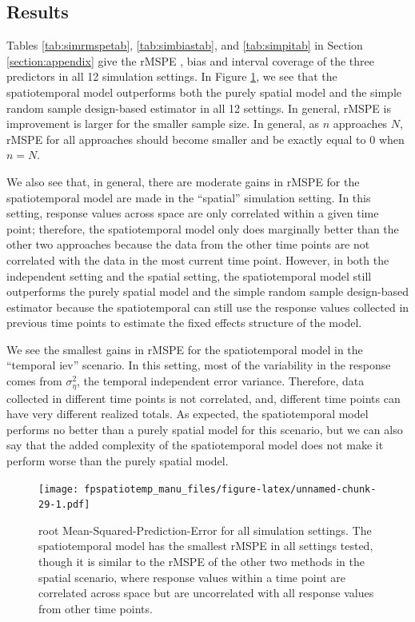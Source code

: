 \documentclass[]{interact}
\theoremstyle{plain}%
\theoremstyle{definition}
\theoremstyle{remark}
\begin{document}
\subsection{Results}

Tables \ref{tab:simrmspetab}, \ref{tab:simbiastab}, and
\ref{tab:simpitab} in Section \ref{section:appendix} give the rMSPE ,
bias and interval coverage of the three predictors in all 12 simulation
settings. In Figure \ref{fig:rmspe}, we see that the spatiotemporal
model outperforms both the purely spatial model and the simple random
sample design-based estimator in all 12 settings. In general, rMSPE is
improvement is larger for the smaller sample size. In general, as \(n\)
approaches \(N\), rMSPE for all approaches should become smaller and be
exactly equal to 0 when \(n = N\).

We also see that, in general, there are moderate gains in rMSPE for the
spatiotemporal model are made in the ``spatial'' simulation setting. In
this setting, response values across space are only correlated within a
given time point; therefore, the spatiotemporal model only does
marginally better than the other two approaches because the data from
the other time points are not correlated with the data in the most
current time point. However, in both the independent setting and the
spatial setting, the spatiotemporal model still outperforms the purely
spatial model and the simple random sample design-based estimator
because the spatiotemporal can still use the response values collected
in previous time points to estimate the fixed effects structure of the
model.

We see the smallest gains in rMSPE for the spatiotemporal model in the
``temporal iev'' scenario. In this setting, most of the variability in
the response comes from \(\sigma^2_{\eta}\), the temporal independent
error variance. Therefore, data collected in different time points is
not correlated, and, different time points can have very different
realized totals. As expected, the spatiotemporal model performs no
better than a purely spatial model for this scenario, but we can also
say that the added complexity of the spatiotemporal model does not make
it perform worse than the purely spatial model.

\begin{figure}
\centering
\texttt{[image: fpspatiotemp\_manu\_files/figure-latex/unnamed-chunk-29-1.pdf]}
\caption{\label{fig:rmspe} root Mean-Squared-Prediction-Error for all
simulation settings. The spatiotemporal model has the smallest rMSPE in
all settings tested, though it is similar to the rMSPE of the other two
methods in the spatial scenario, where response values within a time
point are correlated across space but are uncorrelated with all response
values from other time points.}
\end{figure}
\end{document}
